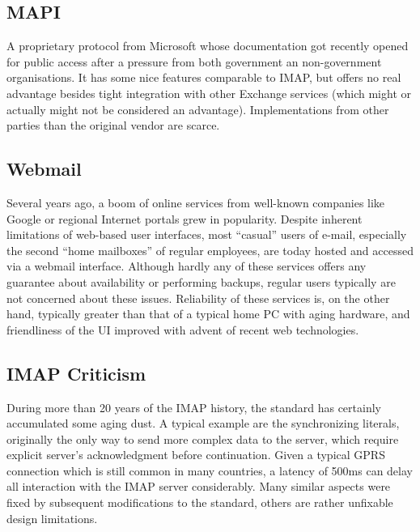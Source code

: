 \documentclass[12pt,notitlepage]{report}
\begin{document}
\subsection{MAPI}

A proprietary protocol from Microsoft whose documentation got recently opened
for public access after a pressure from both government an non-government
organisations.  It has some nice features comparable to IMAP, but offers no real
advantage besides tight integration with other Exchange services (which might or
actually might not be considered an advantage).  Implementations from other
parties than the original vendor are scarce.

\subsection{Webmail}

Several years ago, a boom of online services from well-known companies like
Google or regional Internet portals grew in popularity.  Despite inherent
limitations of web-based user interfaces, most ``casual'' users of e-mail,
especially the second ``home mailboxes'' of regular employees, are today hosted
and accessed via a webmail interface.  Although hardly any of these services
offers any guarantee about availability or performing backups, regular users
typically are not concerned about these issues.  Reliability of these services
is, on the other hand, typically greater than that of a typical home PC with
aging hardware, and friendliness of the UI improved with advent of recent
web technologies.

\subsection{IMAP Criticism}

During more than 20 years of the IMAP history, the standard has certainly
accumulated some aging dust.  A typical example are the synchronizing literals,
originally the only way to send more complex data to the server, which require
explicit server's acknowledgment before continuation.  Given a typical GPRS
connection which is still common in many countries, a latency of 500ms can delay
all interaction with the IMAP server considerably.  Many similar aspects were
fixed by subsequent modifications to the standard, others are rather unfixable
design limitations.
\end{document}
